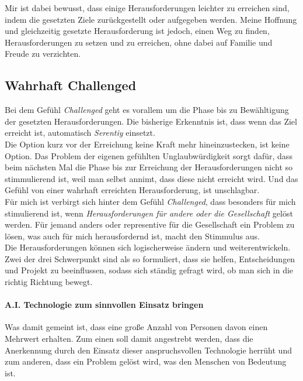 Mir ist dabei bewusst, dass einige Herausforderungen leichter zu erreichen sind, indem die gesetzten Ziele zurückgestellt oder aufgegeben werden. Meine Hoffnung und gleichzeitig gesetzte Herausforderung ist jedoch, einen Weg zu finden, Herausforderungen zu setzen und zu erreichen, ohne dabei auf Familie und Freude zu verzichten. 

\subsection{Wahrhaft Challenged}
Bei dem Gefühl \textit{Challenged} geht es vorallem um die Phase bis zu Bewähltigung der gesetzten Herausforderungen. Die bisherige Erkenntnis ist, dass wenn das Ziel erreicht ist, automatisch \textit{Serentiy} einsetzt.\\

Die Option kurz vor der Erreichung keine Kraft mehr hineinzustecken, ist keine Option. Das Problem der eigenen gefühlten Unglaubwürdigkeit sorgt dafür, dass beim nächsten Mal die Phase bis zur Erreichung der Herausforderungen nicht so stimmulierend ist, weil man selbst annimt, dass diese nicht erreicht wird. Und das Gefühl von einer wahrhaft erreichten Herausforderung, ist unschlagbar.\\

Für mich ist verbirgt sich hinter dem Gefühl \textit{Challenged}, dass besonders für mich stimulierend ist, wenn \textit{Herausforderungen für andere oder die Gesellschaft} gelöst werden. Für jemand anders oder representive für die Gesellschaft ein Problem zu lösen, was auch für mich herausfordernd ist, macht den Stimmulus aus.\\

Die Herausforderungen können sich  logischerweise ändern und weiterentwickeln. Zwei der drei Schwerpunkt sind als so formuliert, dass sie helfen, Entscheidungen und Projekt zu beeinflussen, sodass sich ständig gefragt wird, ob man sich in die richtig Richtung bewegt.\\

\paragraph{A.I. Technologie zum sinnvollen Einsatz bringen}
Was damit gemeint ist, dass eine große Anzahl von Personen davon einen Mehrwert erhalten. Zum einen soll damit angestrebt werden, dass die Anerkennung durch den Einsatz dieser anspruchsvollen Technologie herrüht und zum anderen, dass ein Problem gelöst wird, was den Menschen von Bedeutung ist.\\

